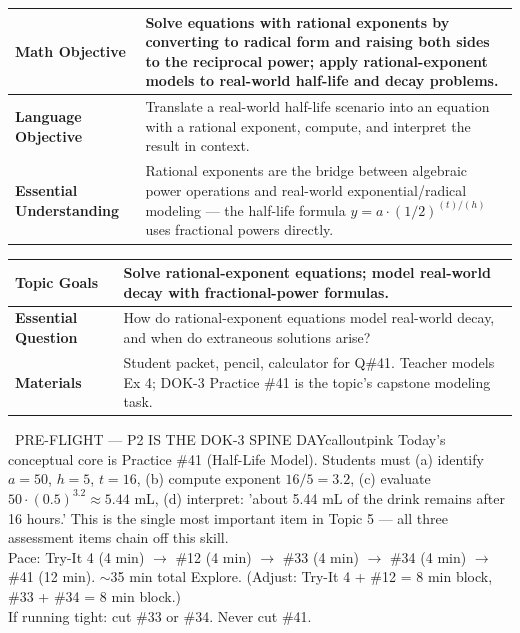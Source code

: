 \documentclass[11pt]{article}
\begin{document}

{\small
\renewcommand{\arraystretch}{1.25}
\noindent\begin{tabular}{|p{1.8in}|p{4.8in}|}
\hline
\textbf{Math Objective} & Solve equations with rational exponents by converting to radical form and raising both sides to the reciprocal power; apply rational-exponent models to real-world half-life and decay problems. \\ \hline
\textbf{Language Objective} & Translate a real-world half-life scenario into an equation with a rational exponent, compute, and interpret the result in context. \\ \hline
\textbf{Essential Understanding} & Rational exponents are the bridge between algebraic power operations and real-world exponential/radical modeling — the half-life formula \(y = a\cdot(1/2)^{(t)/(h)}\) uses fractional powers directly. \\ \hline
\end{tabular}
}

{\small
\renewcommand{\arraystretch}{1.25}
\noindent\begin{tabular}{|p{1.8in}|p{4.8in}|}
\hline
\textbf{Topic Goals} & Solve rational-exponent equations; model real-world decay with fractional-power formulas. \\ \hline
\textbf{Essential Question} & How do rational-exponent equations model real-world decay, and when do extraneous solutions arise? \\ \hline
\textbf{Materials} & Student packet, pencil, calculator for Q\#41. Teacher models Ex 4; DOK-3 Practice \#41 is the topic's capstone modeling task. \\ \hline
\end{tabular}
}

\begin{callout}{\IconPin\ PRE-FLIGHT — P2 IS THE DOK-3 SPINE DAY}{calloutpink}
Today's conceptual core is Practice \#41 (Half-Life Model). Students must (a) identify \(a=50\), \(h=5\), \(t=16\), (b) compute exponent \(16/5 = 3.2\), (c) evaluate \(50\cdot(0.5)^{3.2} \approx 5.44\) mL, (d) interpret: 'about 5.44 mL of the drink remains after 16 hours.' This is the single most important item in Topic 5 — all three assessment items chain off this skill.\\
Pace: Try-It 4 (4 min) \(\rightarrow\) \#12 (4 min) \(\rightarrow\) \#33 (4 min) \(\rightarrow\) \#34 (4 min) \(\rightarrow\) \#41 (12 min). \(\sim\)35 min total Explore. (Adjust: Try-It 4 + \#12 = 8 min block, \#33 + \#34 = 8 min block.)\\
If running tight: cut \#33 or \#34. Never cut \#41.
\end{callout}
\end{document}
